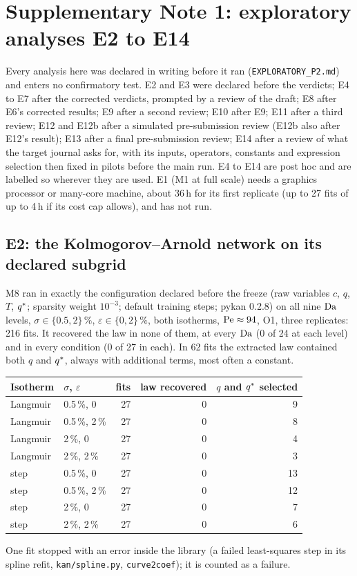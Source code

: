 \section*{Supplementary Note 1: exploratory analyses E2 to E14}
Every analysis here was declared in writing before it ran (\texttt{EXPLORATORY\_P2.md}) and
enters no confirmatory test. E2 and E3 were declared before the verdicts; E4 to E7 after the
corrected verdicts, prompted by a review of the draft; E8 after E6's corrected results; E9 after
a second review; E10 after E9; E11 after a third review; E12 and E12b after a simulated
pre-submission review (E12b also after E12's result); E13 after a final pre-submission review; E14 after a
review of what the target journal asks for, with its inputs, operators, constants and expression selection
then fixed in pilots before the main run. E4 to E14 are post hoc and are labelled so
wherever they are used. E1 (M1 at full scale) needs a graphics
processor or many-core machine, about 36\,h for its first replicate (up to 27 fits of up to 4\,h if its
cost cap allows), and has not run.

\subsection*{E2: the Kolmogorov--Arnold network on its declared subgrid}
M8 ran in exactly the configuration declared before the freeze (raw variables $c$, $q$, $T$, $q^{*}$;
sparsity weight $10^{-3}$; default training steps; pykan 0.2.8) on all nine $\mathrm{Da}$ levels,
$\sigma \in \{0.5, 2\}\,\%$, $\varepsilon \in \{0, 2\}\,\%$, both isotherms, $\mathrm{Pe} \approx 94$, O1, three
replicates: 216 fits. It recovered the law in none of them, at every $\mathrm{Da}$ (0 of 24 at each level)
and in every condition (0 of 27 in each). In 62 fits the extracted law contained both $q$ and $q^{*}$,
always with additional terms, most often a constant.
\begin{center}
\small
\begin{tabular}{@{}llrrr@{}}
\toprule
Isotherm & $\sigma$, $\varepsilon$ & fits & law recovered & $q$ and $q^{*}$ selected \\
\midrule
Langmuir & 0.5\,\%, 0 & 27 & 0 & 9 \\
Langmuir & 0.5\,\%, 2\,\% & 27 & 0 & 8 \\
Langmuir & 2\,\%, 0 & 27 & 0 & 4 \\
Langmuir & 2\,\%, 2\,\% & 27 & 0 & 3 \\
step & 0.5\,\%, 0 & 27 & 0 & 13 \\
step & 0.5\,\%, 2\,\% & 27 & 0 & 12 \\
step & 2\,\%, 0 & 27 & 0 & 7 \\
step & 2\,\%, 2\,\% & 27 & 0 & 6 \\
\bottomrule
\end{tabular}
\end{center}
One fit stopped with an error inside the library (a failed least-squares step in its spline
refit, \texttt{kan/spline.py}, \texttt{curve2coef}); it is counted as a failure.

